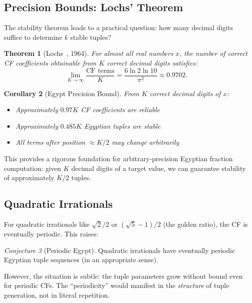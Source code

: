 \documentclass[11pt]{article}
\newtheorem{theorem}{Theorem}
\newtheorem{corollary}[theorem]{Corollary}
\theoremstyle{definition}
\theoremstyle{remark}
\newtheorem{conjecture}[theorem]{Conjecture}
\begin{document}
\subsection{Precision Bounds: Lochs' Theorem}

The stability theorem leads to a practical question: how many decimal digits
suffice to determine $k$ stable tuples?

\begin{theorem}[Lochs~\cite{lochs}, 1964]\label{thm:lochs}
For almost all real numbers $x$, the number of correct CF coefficients
obtainable from $K$ correct decimal digits satisfies:
\[
\lim_{K \to \infty} \frac{\text{CF terms}}{K} = \frac{6 \ln 2 \ln 10}{\pi^2} \approx 0.9702.
\]
\end{theorem}

\begin{corollary}[Egypt Precision Bound]
From $K$ correct decimal digits of $x$:
\begin{itemize}
\item Approximately $0.97 K$ CF coefficients are reliable
\item Approximately $0.485 K$ Egyptian tuples are stable
\item All terms after position $\approx K/2$ may change arbitrarily
\end{itemize}
\end{corollary}

This provides a rigorous foundation for arbitrary-precision Egyptian fraction
computation: given $K$ decimal digits of a target value, we can guarantee
stability of approximately $K/2$ tuples.

\subsection{Quadratic Irrationals}

For quadratic irrationals like $\sqrt{2}/2$ or $(\sqrt{5}-1)/2$ (the golden ratio),
the CF is eventually periodic. This raises:

\begin{conjecture}[Periodic Egypt]
Quadratic irrationals have eventually periodic Egyptian tuple sequences
(in an appropriate sense).
\end{conjecture}

However, the situation is subtle: the tuple parameters grow without bound
even for periodic CFs. The ``periodicity'' would manifest in the \emph{structure}
of tuple generation, not in literal repetition.
\end{document}
